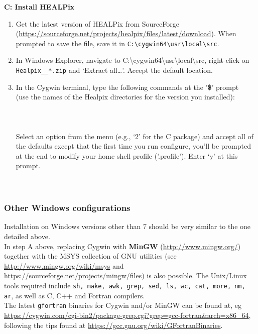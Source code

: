 \documentclass[12pt,twoside]{article}
\begin{document}
\textbf{C: Install HEALPix}
\begin{enumerate}
	\setlength{\itemsep}{-1pt}
	\setlength{\parsep}{-10pt}
\item
  Get the latest version of HEALPix from SourceForge
  (\url{https://sourceforge.net/projects/healpix/files/latest/download}). When
  prompted to save the file, save it in
  \texttt{C:\textbackslash{}cygwin64\textbackslash{}usr\textbackslash{}local\textbackslash{}src}.
\item
  In Windows Explorer, navigate to
  C:\textbackslash{}cygwin64\textbackslash{}usr\textbackslash{}local\textbackslash{}src,
  right-click on \texttt{Healpix\_\hpxversion\_*.zip} and `Extract all\ldots{}'. Accept the
  default location.
\item
  In the Cygwin terminal, type the following commands at the
  '\textbf{\$}' prompt\\ (use the names of the Healpix directories for
  the version you installed):\\ 
	\\ 
	\\ 
	\\ 
	Select an option from the menu (e.g., `2' for the C
  package) and accept all of the defaults except that
  the first time
  you run configure, you'll be prompted at the end to modify your
  home shell profile ('.profile'). Enter `y' at this prompt.\\
  	\\ 
	\\ 
\end{enumerate}

\subsubsection{Other Windows configurations}
\label{sec:windows_other}
Installation on Windows versions other than 7 should be very similar to the one detailed above.\\
In step A above, replacing Cygwin with {\bf MinGW} (\url{http://www.mingw.org/}) 
together with the MSYS collection of GNU utilities 
(see \url{http://www.mingw.org/wiki/msys} and
\url{https://sourceforge.net/projects/mingw/files}) is also possible.
The Unix/Linux tools required include \texttt{sh, make, awk, grep, sed, ls, wc, cat, more, nm, ar},
as well as C, C++ and Fortran compilers.\\
The latest \texttt{gfortran} binaries for Cygwin and/or MinGW can be found at, eg
\hfill \url{https://cygwin.com/cgi-bin2/package-grep.cgi?grep=gcc-fortran&arch=x86_64},
following the tips found at 
\url{https://gcc.gnu.org/wiki/GFortranBinaries}.
\end{document}
